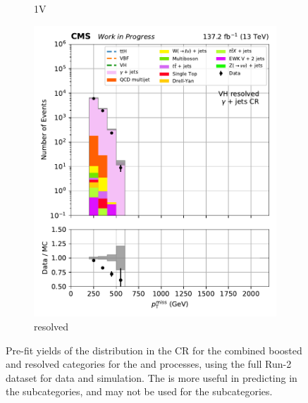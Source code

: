 \begin{figure}[htbp]
\begin{subfigure}[b]{0.24\textwidth}
        \caption{\VH 1V}
    \end{subfigure}
    \hfill
    \begin{subfigure}[b]{0.24\textwidth}
        \includegraphics[width=\textwidth]{figures/region_plots/2016to18/region_5/VH_resolved.pdf}
        \caption{\VH resolved}
    \end{subfigure}
    \caption[Pre-fit yields of the \ptmiss distribution in the \singlePhotonCr control region for the combined boosted and resolved categories for the \ttH and \VH processes, using the full Run-2 dataset for data and simulation]{Pre-fit yields of the \ptmiss distribution in the \singlePhotonCr \gls{CR} for the combined boosted and resolved categories for the \ttH and \VH processes, using the full Run-2 dataset for data and simulation. The \singlePhotonCr is more useful in predicting \ztonunupjets in the \VH subcategories, and may not be used for the \ttH subcategories.}
    \label{fig:htoinv_cr_yields_comb2016to18_single_photon}
\end{figure}




